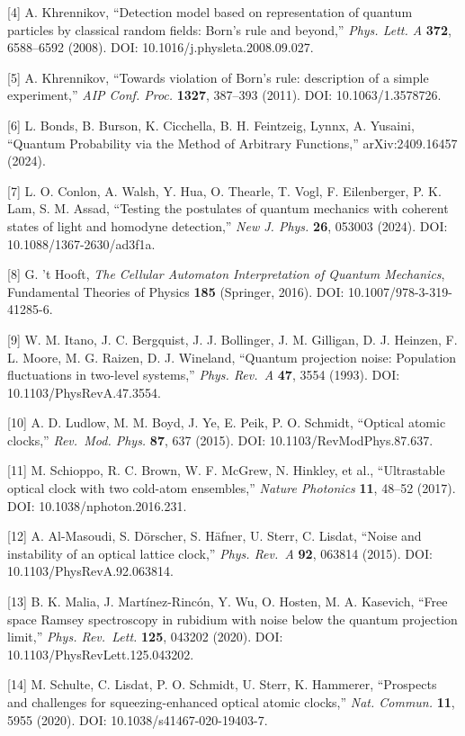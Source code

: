 \documentclass[
]{ltjsarticle}
\begin{document}
{[}4{]} A. Khrennikov, ``Detection model based on representation of
quantum particles by classical random fields: Born's rule and beyond,''
\emph{Phys. Lett. A} \textbf{372}, 6588--6592 (2008). DOI:
10.1016/j.physleta.2008.09.027.

{[}5{]} A. Khrennikov, ``Towards violation of Born's rule: description
of a simple experiment,'' \emph{AIP Conf. Proc.} \textbf{1327}, 387--393
(2011). DOI: 10.1063/1.3578726.

{[}6{]} L. Bonds, B. Burson, K. Cicchella, B. H. Feintzeig, Lynnx, A.
Yusaini, ``Quantum Probability via the Method of Arbitrary Functions,''
arXiv:2409.16457 (2024).

{[}7{]} L. O. Conlon, A. Walsh, Y. Hua, O. Thearle, T. Vogl, F.
Eilenberger, P. K. Lam, S. M. Assad, ``Testing the postulates of quantum
mechanics with coherent states of light and homodyne detection,''
\emph{New J. Phys.} \textbf{26}, 053003 (2024). DOI:
10.1088/1367-2630/ad3f1a.

{[}8{]} G. 't Hooft, \emph{The Cellular Automaton Interpretation of
Quantum Mechanics}, Fundamental Theories of Physics \textbf{185}
(Springer, 2016). DOI: 10.1007/978-3-319-41285-6.

{[}9{]} W. M. Itano, J. C. Bergquist, J. J. Bollinger, J. M. Gilligan,
D. J. Heinzen, F. L. Moore, M. G. Raizen, D. J. Wineland, ``Quantum
projection noise: Population fluctuations in two-level systems,''
\emph{Phys. Rev.~A} \textbf{47}, 3554 (1993). DOI:
10.1103/PhysRevA.47.3554.

{[}10{]} A. D. Ludlow, M. M. Boyd, J. Ye, E. Peik, P. O. Schmidt,
``Optical atomic clocks,'' \emph{Rev.~Mod. Phys.} \textbf{87}, 637
(2015). DOI: 10.1103/RevModPhys.87.637.

{[}11{]} M. Schioppo, R. C. Brown, W. F. McGrew, N. Hinkley, et al.,
``Ultrastable optical clock with two cold-atom ensembles,'' \emph{Nature
Photonics} \textbf{11}, 48--52 (2017). DOI: 10.1038/nphoton.2016.231.

{[}12{]} A. Al-Masoudi, S. Dörscher, S. Häfner, U. Sterr, C. Lisdat,
``Noise and instability of an optical lattice clock,'' \emph{Phys.
Rev.~A} \textbf{92}, 063814 (2015). DOI: 10.1103/PhysRevA.92.063814.

{[}13{]} B. K. Malia, J. Martínez-Rincón, Y. Wu, O. Hosten, M. A.
Kasevich, ``Free space Ramsey spectroscopy in rubidium with noise below
the quantum projection limit,'' \emph{Phys. Rev.~Lett.} \textbf{125},
043202 (2020). DOI: 10.1103/PhysRevLett.125.043202.

{[}14{]} M. Schulte, C. Lisdat, P. O. Schmidt, U. Sterr, K. Hammerer,
``Prospects and challenges for squeezing-enhanced optical atomic
clocks,'' \emph{Nat. Commun.} \textbf{11}, 5955 (2020). DOI:
10.1038/s41467-020-19403-7.
\end{document}
